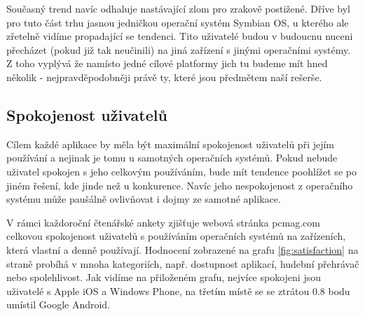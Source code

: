 \documentclass[thesis=M,czech]{FITthesis}[2012/06/26]
\begin{document}
Současný trend navíc odhaluje nastávající zlom pro zrakově postižené. Dříve byl pro tuto část trhu jasnou jedničkou operační systém Symbian OS, u kterého ale zřetelně vidíme propadající se tendenci. Tito uživatelé budou v budoucnu nuceni přecházet (pokud již tak neučinili) na jiná zařízení s jinými operačními systémy. Z toho vyplývá že namísto jedné cílové platformy jich tu budeme mít hned několik - nejpravděpodobněji právě ty, které jsou předmětem naší rešerše.

\subsection{Spokojenost uživatelů}
Cílem každé aplikace by měla být maximální spokojenost uživatelů při jejím používání a nejinak je tomu u samotných operačních systémů. Pokud nebude uživatel spokojen s jeho celkovým používáním, bude mít tendence poohlížet se po jiném řešení, kde jinde než u konkurence. Navíc jeho nespokojenost z operačního systému může paušálně ovlivňovat i dojmy ze samotné aplikace.

V rámci každoroční čtenářské ankety  zjišťuje webová stránka pcmag.com celkovou spokojenost uživatelů s používáním operačních systémů na zařízeních, která vlastní a denně používají. Hodnocení zobrazené na grafu \ref{fig:satisfaction} na straně \pageref{fig:satisfaction} probíhá v mnoha kategoriích, např. dostupnost aplikací, hudební přehrávač nebo spolehlivost. Jak vidíme na přiloženém grafu, nejvíce spokojeni jsou uživatelé s Apple iOS a Windows Phone, na třetím místě se se ztrátou 0.8 bodu umístil Google Android.
\end{document}
